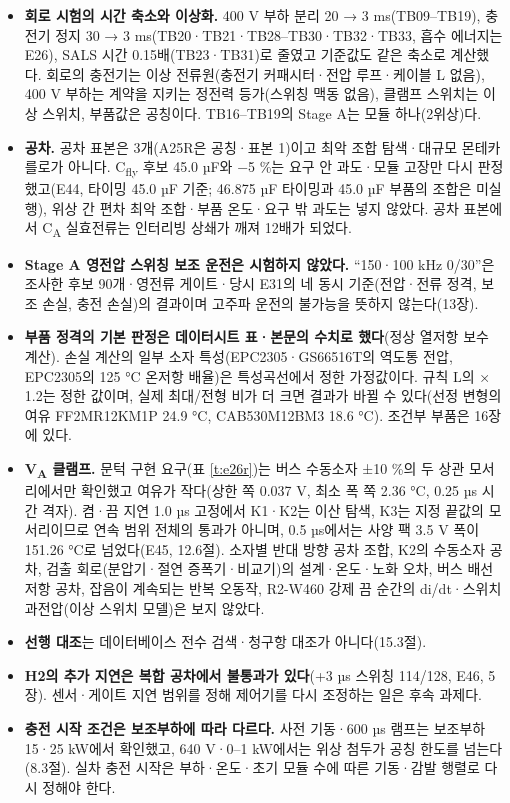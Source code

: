 \begin{itemize}
\item \textbf{회로 시험의 시간 축소와 이상화.} 400 V 부하 분리 20 → 3 ms(TB09–TB19), 충전기 정지 30 → 3 ms(TB20·TB21·TB28–TB30·TB32·TB33, 흡수 에너지는 E26), SALS 시간 0.15배(TB23·TB31)로 줄였고 기준값도 같은 축소로 계산했다. 회로의 충전기는 이상 전류원(충전기 커패시터·전압 루프·케이블 L 없음), 400 V 부하는 계약을 지키는 정전력 등가(스위칭 맥동 없음), 클램프 스위치는 이상 스위치, 부품값은 공칭이다. TB16–TB19의 Stage A는 모듈 하나(2위상)다.
\item \textbf{공차.} 공차 표본은 3개(A25R은 공칭·표본 1)이고 최악 조합 탐색·대규모 몬테카를로가 아니다. C\textsubscript{fly} 후보 45.0 µF와 −5 \%는 요구 안 과도·모듈 고장만 다시 판정했고(E44, 타이밍 45.0 µF 기준; 46.875 µF 타이밍과 45.0 µF 부품의 조합은 미실행), 위상 간 편차 최악 조합·부품 온도·요구 밖 과도는 넣지 않았다. 공차 표본에서 C\textsubscript{A} 실효전류는 인터리빙 상쇄가 깨져 12배가 되었다.
\item \textbf{Stage A 영전압 스위칭 보조 운전은 시험하지 않았다.} “150·100 kHz 0/30”은 조사한 후보 90개·영전류 게이트·당시 E31의 네 동시 기준(전압·전류 정격, 보조 손실, 충전 손실)의 결과이며 고주파 운전의 불가능을 뜻하지 않는다(13장).
\item \textbf{부품 정격의 기본 판정은 데이터시트 표·본문의 수치로 했다}(정상 열저항 보수 계산). 손실 계산의 일부 소자 특성(EPC2305·GS66516T의 역도통 전압, EPC2305의 125 °C 온저항 배율)은 특성곡선에서 정한 가정값이다. 규칙 L의 × 1.2는 정한 값이며, 실제 최대/전형 비가 더 크면 결과가 바뀔 수 있다(선정 변형의 여유 FF2MR12KM1P 24.9 °C, CAB530M12BM3 18.6 °C). 조건부 부품은 16장에 있다.
\item \textbf{V\textsubscript{A} 클램프.} 문턱 구현 요구(표 \ref{t:e26r})는 버스 수동소자 ±10 \%의 두 상관 모서리에서만 확인했고 여유가 작다(상한 쪽 0.037 V, 최소 폭 쪽 2.36 °C, 0.25 µs 시간 격자). 켬·끔 지연 1.0 µs 고정에서 K1·K2는 이산 탐색, K3는 지정 끝값의 모서리이므로 연속 범위 전체의 통과가 아니며, 0.5 µs에서는 사양 팩 3.5 V 폭이 151.26 °C로 넘었다(E45, 12.6절). 소자별 반대 방향 공차 조합, K2의 수동소자 공차, 검출 회로(분압기·절연 증폭기·비교기)의 설계·온도·노화 오차, 버스 배선 저항 공차, 잡음이 계속되는 반복 오동작, R2-W460 강제 끔 순간의 di/dt·스위치 과전압(이상 스위치 모델)은 보지 않았다.
\item \textbf{선행 대조}는 데이터베이스 전수 검색·청구항 대조가 아니다(15.3절).
\item \textbf{H2의 추가 지연은 복합 공차에서 불통과가 있다}(+3 µs 스위칭 114/128, E46, 5장). 센서·게이트 지연 범위를 정해 제어기를 다시 조정하는 일은 후속 과제다.
\item \textbf{충전 시작 조건은 보조부하에 따라 다르다.} 사전 기동·600 µs 램프는 보조부하 15·25 kW에서 확인했고, 640 V·0–1 kW에서는 위상 첨두가 공칭 한도를 넘는다(8.3절). 실차 충전 시작은 부하·온도·초기 모듈 수에 따른 기동·감발 행렬로 다시 정해야 한다.

\end{itemize}
